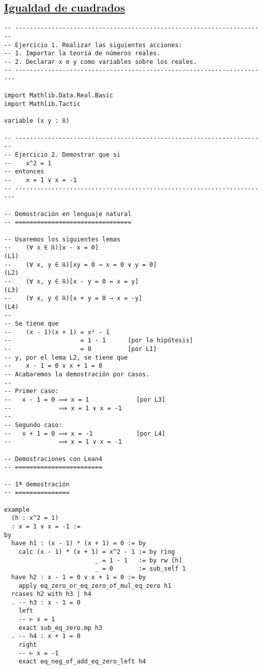 \subsection{\href{./src/Logica/Igualdad\_de\_cuadrados.lean}{Igualdad de cuadrados}}
\label{sec:org2d8990e}
\begin{verbatim}
-- ---------------------------------------------------------------------
-- Ejercicio 1. Realizar las siguientes acciones:
-- 1. Importar la teoría de números reales.
-- 2. Declarar x e y como variables sobre los reales.
-- ----------------------------------------------------------------------

import Mathlib.Data.Real.Basic
import Mathlib.Tactic

variable (x y : ℝ)

-- ---------------------------------------------------------------------
-- Ejercicio 2. Demostrar que si
--    x^2 = 1
-- entonces
--    x = 1 ∨ x = -1
-- ----------------------------------------------------------------------

-- Demostración en lenguaje natural
-- ================================

-- Usaremos los siguientes lemas
--    (∀ x ∈ ℝ)[x - x = 0]                                           (L1)
--    (∀ x, y ∈ ℝ)[xy = 0 → x = 0 ∨ y = 0]                           (L2)
--    (∀ x, y ∈ ℝ)[x - y = 0 ↔ x = y]                                (L3)
--    (∀ x, y ∈ ℝ)[x + y = 0 → x = -y]                               (L4)
--
-- Se tiene que
--    (x - 1)(x + 1) = x² - 1
--                   = 1 - 1      [por la hipótesis]
--                   = 0          [por L1]
-- y, por el lema L2, se tiene que
--    x - 1 = 0 ∨ x + 1 = 0
-- Acabaremos la demostración por casos.
--
-- Primer caso:
--   x - 1 = 0 ⟹ x = 1             [por L3]
--             ⟹ x = 1 ∨ x = -1
--
-- Segundo caso:
--   x + 1 = 0 ⟹ x = -1            [por L4]
--             ⟹ x = 1 ∨ x = -1

-- Demostraciones con Lean4
-- ========================

-- 1ª demostración
-- ===============

example
  (h : x^2 = 1)
  : x = 1 ∨ x = -1 :=
by
  have h1 : (x - 1) * (x + 1) = 0 := by
    calc (x - 1) * (x + 1) = x^2 - 1 := by ring
                         _ = 1 - 1   := by rw [h]
                         _ = 0       := sub_self 1
  have h2 : x - 1 = 0 ∨ x + 1 = 0 := by
    apply eq_zero_or_eq_zero_of_mul_eq_zero h1
  rcases h2 with h3 | h4
  . -- h3 : x - 1 = 0
    left
    -- ⊢ x = 1
    exact sub_eq_zero.mp h3
  . -- h4 : x + 1 = 0
    right
    -- ⊢ x = -1
    exact eq_neg_of_add_eq_zero_left h4


\end{verbatim}
